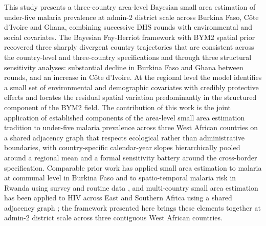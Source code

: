 \documentclass{article}
\begin{document}
This study presents a three-country area-level Bayesian small area
estimation of under-five malaria prevalence at admin-2 district scale
across Burkina Faso, Côte d'Ivoire and Ghana, combining successive DHS
rounds with environmental and social covariates. The Bayesian
Fay-Herriot framework with BYM2 spatial prior recovered three sharply
divergent country trajectories that are consistent across the
country-level and three-country specifications and through three
structural sensitivity analyses: substantial decline in Burkina Faso and
Ghana between rounds, and an increase in Côte d'Ivoire. At the regional
level the model identifies a small set of environmental and demographic
covariates with credibly protective effects and locates the residual
spatial variation predominantly in the structured component of the BYM2
field. The contribution of this work is the joint application of
established components of the area-level small area estimation tradition
\citep{wu2021} to under-five malaria prevalence across three West
African countries on a shared adjacency graph that respects ecological
rather than administrative boundaries, with country-specific
calendar-year slopes hierarchically pooled around a regional mean and a
formal sensitivity battery around the cross-border specification.
Comparable prior work has applied small area estimation to malaria at
communal level in Burkina Faso \citep{bassinga2024} and to
spatio-temporal malaria risk in Rwanda using survey and routine data
\citep{semakula2023}, and multi-country small area estimation has been
applied to HIV across East and Southern Africa using a shared adjacency
graph \citep{saldarriaga2020}; the framework presented here brings these
elements together at admin-2 district scale across three contiguous West
African countries.
\end{document}
